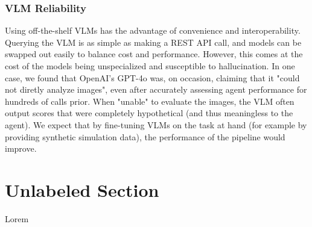 \documentclass{article}
\begin{document}
\subsubsection{VLM Reliability}
Using off-the-shelf VLMs has the advantage of convenience and interoperability. Querying the VLM is as simple as making a REST API call, and models can be swapped out easily to balance cost and performance. However, this comes at the cost of the models being unspecialized and susceptible to hallucination. In one case, we found that OpenAI's GPT-4o was, on occasion, claiming that it "could not diretly analyze images", even after accurately assessing agent performance for hundreds of calls prior. When "unable" to evaluate the images, the VLM often output scores that were completely hypothetical (and thus meaningless to the agent). We expect that by fine-tuning VLMs on the task at hand (for example by providing synthetic simulation data), the performance of the pipeline would improve. 


\section*{Unlabeled Section}
Lorem


 
\end{document}
